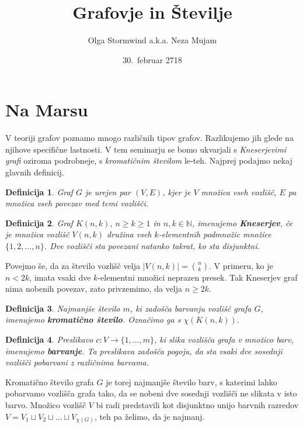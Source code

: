 \documentclass[a4paper,12pt]{article}
\title{Grafovje in Številje}
\author{Olga Stormwind a.k.a. Neza Mujam}
\date{30.\ februar 2718}
\newtheorem{definicija}{Definicija}
\begin{document}
 
\maketitle


\section{Na Marsu}

V teoriji grafov poznamo mnogo različnih tipov grafov. Razlikujemo jih glede na njihove specifične lastnosti. V tem seminarju se bomo ukvarjali s {\em Kneserjevimi grafi} oziroma podrobneje, s {\em kromatičnim številom} le-teh. Najprej podajmo nekaj glavnih definicij.


\begin{definicija}
{\em Graf} $G$ je urejen par $(V,E)$, kjer je $V$ množica vseh vozlišč, $E$ pa množica vseh povezav med temi vozlišči.
\end{definicija} 

\begin{definicija}
Graf $K(n,k)$, $n \geq k \geq 1$ in $n, k \in \mathbb{N}$, imenujemo \mbox{\textbf{Kneserjev}}, če je množica vozlišč $V(n,k)$ družina vseh $k$-elementnih podmnožic množice $\{1, 2, \ldots, n\}$. Dve vozlišči sta povezani natanko takrat, ko sta disjunktni. 
\end{definicija}

Povejmo še, da za število vozlišč velja $|V(n,k)|={{n}\choose{k}}$. V primeru, ko je $n < 2k$, imata vsaki dve $k$-elementni množici neprazen presek. Tak Kneserjev graf nima nobenih povezav, zato privzemimo, da velja $n \geq 2k$.


\begin{definicija}
Najmanjše število $m$, ki zadošča barvanju vozlišč grafa $G$, imenujemo \textbf {kromatično število}. Označimo ga s $\chi(K(n,k)).$
\end{definicija}

\begin{definicija}
Preslikavo $c: V \rightarrow \{1, \ldots, m\}$, ki slika vozlišča grafa v množico barv, imenujemo \textbf {barvanje}. Ta preslikava zadošča pogoju, da sta vsaki dve sosednji vozlišči pobarvani z različnima barvama.
\end{definicija}

Kromatično število grafa $G$ je torej najmanjše število barv, s katerimi lahko pobarvamo vozlišča grafa tako, da se nobeni dve sosednji vozlišči ne slikata v isto barvo. Množico vozlišč $V$ bi radi predstavili kot disjunktno unijo barvnih razredov $V = V_1 \sqcup V_2 \sqcup \ldots \sqcup V_{\chi(G)}$, teh pa želimo, da je najmanj.
\newpage 
\end{document}
